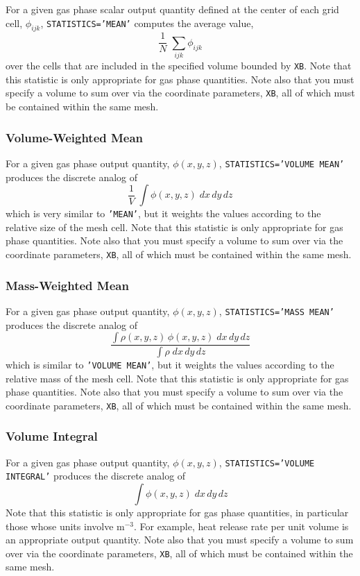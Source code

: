 \documentclass[11pt]{book}
\newcommand{\ct}{\tt\small}
\newcommand{\be}{\begin{equation}}
\newcommand{\ee}{\end{equation}}
\begin{document}
For a given gas phase scalar output quantity defined at the center of each grid cell, $\phi_{ijk}$, {\ct STATISTICS='MEAN'} computes the average value,
\be \frac{1}{N} \; \sum_{ijk} \phi_{ijk}  \ee
over the cells that are included in the specified volume bounded by {\ct XB}. Note that this
statistic is only appropriate for gas phase quantities. Note also that you must specify a volume to sum over via the
coordinate parameters, {\ct XB}, all of which must be contained within the same mesh.

\subsubsection{Volume-Weighted Mean}

For a given gas phase output quantity, $\phi(x,y,z)$, {\ct STATISTICS='VOLUME MEAN'} produces the discrete analog of
\be \frac{1}{V} \; \int \phi(x,y,z) \; dx \, dy \, dz \ee
which is very similar to {\ct 'MEAN'}, but it weights the values according to the relative size of the mesh cell. Note that this
statistic is only appropriate for gas phase quantities. Note also that you must specify a volume to sum over via the
coordinate parameters, {\ct XB}, all of which must be contained within the same mesh.

\subsubsection{Mass-Weighted Mean}

For a given gas phase output quantity, $\phi(x,y,z)$, {\ct STATISTICS='MASS MEAN'} produces the discrete analog of
\be \frac{ \int \rho(x,y,z) \, \phi(x,y,z) \; dx \, dy \, dz}{\int \rho \; dx \, dy \, dz}  \ee
which is similar to {\ct 'VOLUME MEAN'}, but it weights the values according to the relative mass of the mesh cell. Note that this
statistic is only appropriate for gas phase quantities. Note also that you must specify a volume to sum over via the
coordinate parameters, {\ct XB}, all of which must be contained within the same mesh.

\subsubsection{Volume Integral}

For a given gas phase output quantity, $\phi(x,y,z)$, {\ct STATISTICS='VOLUME INTEGRAL'} produces the discrete analog of
\be \int \phi(x,y,z) \; dx \, dy \, dz \ee
Note that this statistic is only appropriate for gas phase quantities, in particular those whose units involve m$^{-3}$. For example,
heat release rate per unit volume is an appropriate output quantity. Note also that you must specify a volume to sum over via the
coordinate parameters, {\ct XB}, all of which must be contained within the same mesh.
\end{document}
